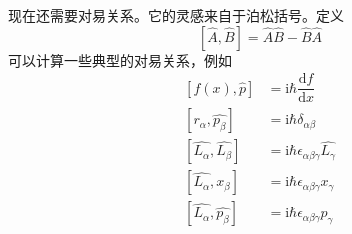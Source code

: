 \documentclass[12pt, a4paper, oneside]{ctexart}
\begin{document}
	现在还需要对易关系。它的灵感来自于泊松括号。定义
	\begin{equation}
		\left[\hat{A},\hat{B}\right]=\hat{A}\hat{B}-\hat{B}\hat{A}
	\end{equation}
	\quad\quad 可以计算一些典型的对易关系，例如
	\begin{align}
		\left[f(x),\hat{p}\right]&=\mathrm{i}\hbar\dfrac{\mathrm{d}f}{\mathrm{d}x}\\
		\left[r_{\alpha},\hat{p_{\beta}}\right]&=\mathrm{i}\hbar\delta_{\alpha\beta}\\
		\left[\hat{L_{\alpha}},\hat{L_{\beta}}\right]&=\mathrm{i}\hbar \epsilon_{\alpha\beta\gamma}\hat{L_{\gamma}}\\
		\left[\hat{L_{\alpha}},x_{\beta}\right]&=\mathrm{i}\hbar \epsilon_{\alpha\beta\gamma}x_{\gamma}\\
		\left[\hat{L_{\alpha}},\hat{p_{\beta}}\right]&=\mathrm{i}\hbar \epsilon_{\alpha\beta\gamma}\hat{p_{\gamma}}\\
	\end{align}
\end{document}
